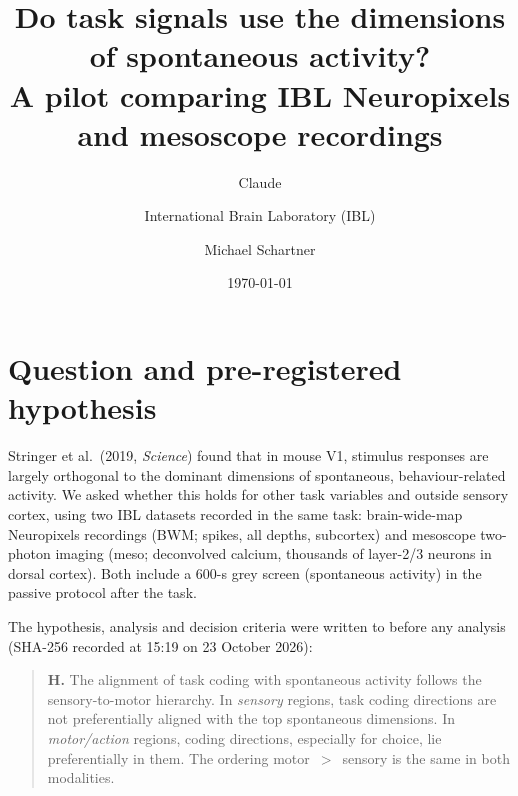 \documentclass[10pt]{article}
\title{Do task signals use the dimensions of spontaneous activity?\\[0.2em]\large A pilot comparing IBL Neuropixels and mesoscope recordings}
\author{Claude \and International Brain Laboratory (IBL) \and Michael Schartner}
\date{\today}
\begin{document}
\maketitle

\begin{center}
\end{center}

\section{Question and pre-registered hypothesis}

Stringer et al.\ (2019, \emph{Science}) found that in mouse V1, stimulus responses are largely orthogonal to the dominant dimensions of spontaneous, behaviour-related activity. We asked whether this holds for other task variables and outside sensory cortex, using two IBL datasets recorded in the same task: brain-wide-map Neuropixels recordings (BWM; spikes, all depths, subcortex) and mesoscope two-photon imaging (meso; deconvolved calcium, thousands of layer-2/3 neurons in dorsal cortex). Both include a 600-s grey screen (spontaneous activity) in the passive protocol after the task.

The hypothesis, analysis and decision criteria were written to  before any analysis (SHA-256 recorded at 15:19 on 23 October 2026):

\begin{quote}
\textbf{H.} The alignment of task coding with spontaneous activity follows the sensory-to-motor hierarchy. In \emph{sensory} regions, task coding directions are not preferentially aligned with the top spontaneous dimensions. In \emph{motor/action} regions, coding directions, especially for choice, lie preferentially in them. The ordering motor~$>$~sensory is the same in both modalities.
\end{quote}
\end{document}
